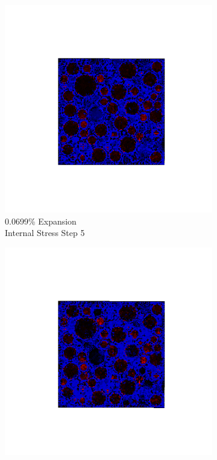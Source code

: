 \begin{figure}[ht!]
\centering
    \begin{subfigure}{.25\textwidth}
      \centering
      \includegraphics[width=1.0\linewidth]{Files/exp_3D/ASR/A30P75_1_s5.png}
      \caption{0.0699\% Expansion\\Internal Stress Step 5}
    \end{subfigure}%
    \begin{subfigure}{.25\textwidth}
      \centering
      \includegraphics[width=1.0\linewidth]{Files/exp_3D/ASR/A30P75_1_s10.png}

\end{subfigure}
\end{figure}
